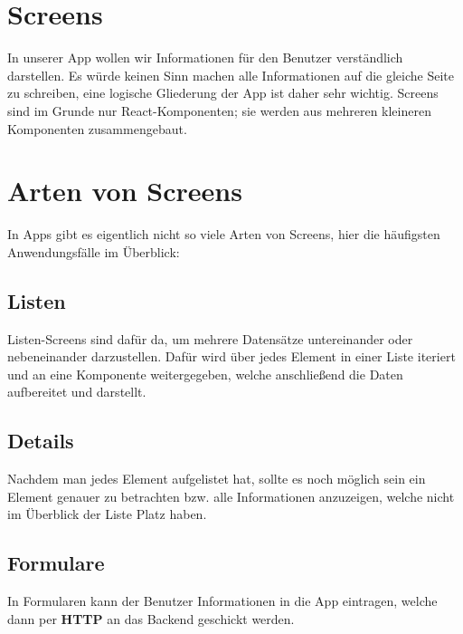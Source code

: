 \section{Screens}
In unserer App wollen wir Informationen für den Benutzer verständlich darstellen. Es würde keinen
Sinn machen alle Informationen auf die gleiche Seite zu schreiben, eine logische Gliederung der App
ist daher sehr wichtig. Screens sind im Grunde nur React-Komponenten; sie werden aus mehreren
kleineren Komponenten zusammengebaut.

\section{Arten von Screens}
In Apps gibt es eigentlich nicht so viele Arten von Screens, hier die häufigsten Anwendungsfälle im
Überblick:

\subsection{Listen}
Listen-Screens sind dafür da, um mehrere Datensätze untereinander oder nebeneinander darzustellen.
Dafür wird über jedes Element in einer Liste iteriert und an eine Komponente weitergegeben, welche
anschließend die Daten aufbereitet und darstellt.

\subsection{Details}
Nachdem man jedes Element aufgelistet hat, sollte es noch möglich sein ein Element genauer zu
betrachten bzw. alle Informationen anzuzeigen, welche nicht im Überblick der Liste Platz haben.

\subsection{Formulare}
In Formularen kann der Benutzer Informationen in die App eintragen, welche dann per \textbf{HTTP} an
das Backend geschickt werden.